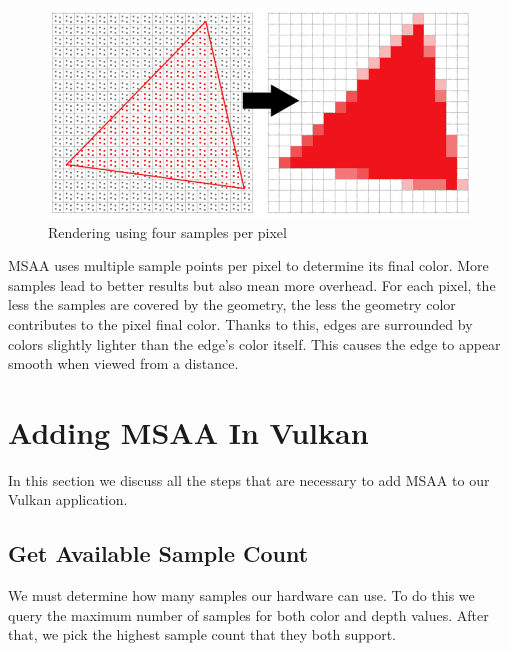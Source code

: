 \begin{figure}[H]
    \centering
    \includegraphics[scale=0.62]{images/ChMSAA/FourSamplesPerPixel.png}
    \caption{Rendering using four samples per pixel}
    \label{fig::FourSamplesPerPixel}
\end{figure}

MSAA uses multiple sample points per pixel to determine its final color.
More samples lead to better results but also mean more overhead.
For each pixel, the less the samples are covered by the geometry, the less
the geometry color contributes to the pixel final color.
Thanks to this, edges are surrounded by colors slightly lighter than the
edge's color itself.
This causes the edge to appear smooth when viewed from a distance.

\section{Adding MSAA In Vulkan}

In this section we discuss all the steps that are necessary to add MSAA
to our Vulkan application.

\subsection{Get Available Sample Count}

We must determine how many samples our hardware can use.
To do this we query the maximum number of samples for both color and depth values.
After that, we pick the highest sample count that they both support.

\begin{minipage}{\linewidth}{\noindent}
    
\end{minipage}

